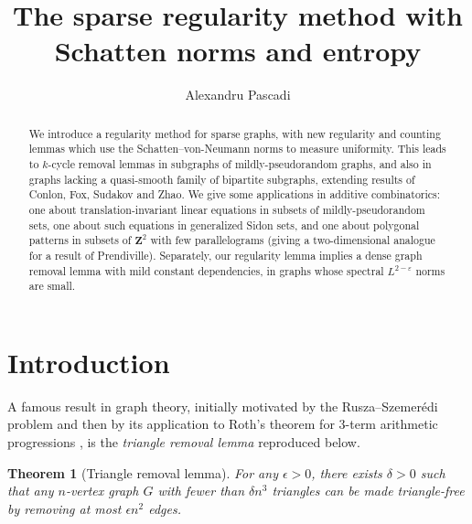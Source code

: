 \documentclass[reqno,11pt]{amsart}
\title{The sparse regularity method with Schatten norms and entropy}
\author[Alexandru Pascadi]{Alexandru Pascadi}
\newtheorem{knowntheorem}{Theorem}
\theoremstyle{definition}
\theoremstyle{remark}
\numberwithin{equation}{section}
\newcommand{\Z}{\mathbf{Z}}
\newcommand{\eps}{\varepsilon}
\begin{document}
\maketitle

\begin{abstract} 
We introduce a regularity method for sparse graphs, with new regularity and counting lemmas which use the Schatten--von-Neumann norms to measure uniformity. This leads to $k$-cycle removal lemmas in subgraphs of mildly-pseudorandom graphs, and also in graphs lacking a quasi-smooth family of bipartite subgraphs, extending results of Conlon, Fox, Sudakov and Zhao. We give some applications in additive combinatorics: one about translation-invariant linear equations in subsets of mildly-pseudorandom sets, one about such equations in generalized Sidon sets, and one about polygonal patterns in subsets of $\Z^2$ with few parallelograms (giving a two-dimensional analogue for a result of Prendiville). Separately, our regularity lemma implies a dense graph removal lemma with mild constant dependencies, in graphs whose spectral $L^{2-\eps}$ norms are small.
\end{abstract}


\section{Introduction} \label{sec:introduction}



A famous result in graph theory, initially motivated by the Rusza--Szemer\'edi problem \cite{ruzsa1978triple} and then by its application to Roth's theorem for $3$-term arithmetic progressions \cite{roth1953certain}, is the \emph{triangle removal lemma} reproduced below.

\begin{knowntheorem}[Triangle removal lemma] \label{thm:dense-triangle-removal} 
For any $\epsilon > 0$, there exists $\delta > 0$ such that any $n$-vertex graph $G$ with fewer than $\delta n^3$ triangles can be made triangle-free by removing at most $\epsilon n^2$ edges.
\end{knowntheorem}
\end{document}
